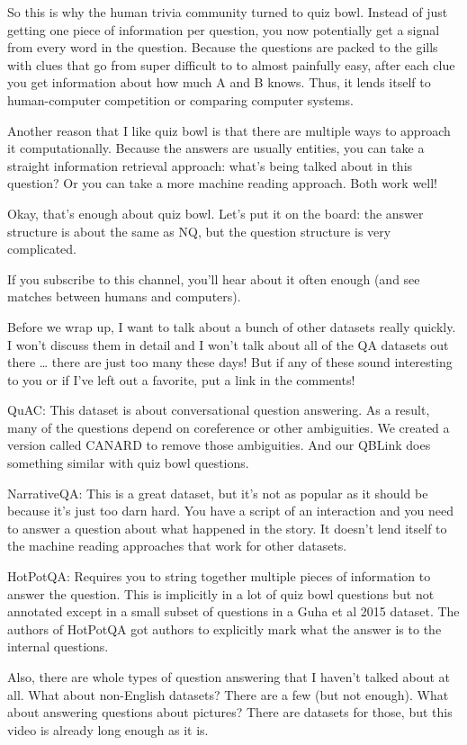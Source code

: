 So this is why the human trivia community turned to quiz bowl. Instead of just getting one piece of information per question, you now potentially get a signal from every word in the question. Because the questions are packed to the gills with clues that go from super difficult to to almost painfully easy, after each clue you get information about how much A and B knows. Thus, it lends itself to human-computer competition or comparing computer systems.

Another reason that I like quiz bowl is that there are multiple ways to approach it computationally. Because the answers are usually entities, you can take a straight information retrieval approach: what’s being talked about in this question? Or you can take a more machine reading approach. Both work well!

Okay, that’s enough about quiz bowl. Let’s put it on the board: the answer structure is about the same as NQ, but the question structure is very complicated.

If you subscribe to this channel, you’ll hear about it often enough (and see matches between humans and computers). 

Before we wrap up, I want to talk about a bunch of other datasets really quickly.  I won’t discuss them in detail and I won’t talk about all of the QA datasets out there … there are just too many these days!  But if any of these sound interesting to you or if I’ve left out a favorite, put a link in the comments!

QuAC: This dataset is about conversational question answering. As a result, many of the questions depend on coreference or other ambiguities. We created a version called CANARD to remove those ambiguities. And our QBLink does something similar with quiz bowl questions.

NarrativeQA: This is a great dataset, but it’s not as popular as it should be because it’s just too darn hard. You have a script of an interaction and you need to answer a question about what happened in the story. It doesn’t lend itself to the machine reading approaches that work for other datasets.

HotPotQA: Requires you to string together multiple pieces of information to answer the question. This is implicitly in a lot of quiz bowl questions but not annotated except in a small subset of questions in a Guha et al 2015 dataset. The authors of HotPotQA got authors to explicitly mark what the answer is to the internal questions.

Also, there are whole types of question answering that I haven’t talked about at all. What about non-English datasets? There are a few (but not enough). What about answering questions about pictures? There are datasets for those, but this video is already long enough as it is. 

